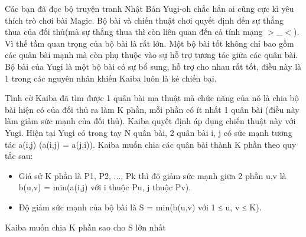 Các bạn đã đọc bộ truyện tranh Nhật Bản Yugi-oh chắc hẳn ai cũng cực kì yêu thích trò chơi bài Magic. Bộ bài và chiến thuật chơi quyết định đến sự thắng thua của đối thủ(mà sự thắng thua thì còn liên quan đến cả tính mạng $>$\_$<$). Vì thế tầm quan trọng của bộ bài là rất lớn. Một bộ bài tốt không chỉ bao gồm các quân bài mạnh mà còn phụ thuộc vào sự hỗ trợ tương tác giữa các quân bài. Bộ bài của Yugi là một bộ bài có sự bổ sung, hỗ trợ cho nhau rất tốt, điều này là 1 trong các nguyên nhân khiến Kaiba luôn là kẻ chiến bại.  

   Tình cờ Kaiba đã tìm được 1 quân bài ma thuật mà chức năng của nó là chia bộ bài hiện có của đối thủ ra làm K phần, mỗi phần có ít nhất 1 quân bài (điều này làm giảm sức mạnh của đối thủ). Kaiba quyết định áp dụng chiến thuật này với Yugi. Hiện tại Yugi có trong tay N quân bài, 2 quân bài i, j có sức mạnh tương tác a(i,j) (a(i,j) = a(j,i)). Kaiba muốn chia các quân bài thành K phần theo quy tắc sau:  
\begin{itemize}
	\item     Giả sử K phần là P1, P2, ..., Pk thì độ giảm sức mạnh giữa 2 phần u,v là b(u,v) = min(a(i,j) với i thuộc Pu, j thuộc Pv).   
	\item     Độ giảm sức mạnh của bộ bài là S = min(b(u,v) với 1 ≤ u, v ≤ K).   
\end{itemize}

   Kaiba muốn chia K phần sao cho S lớn nhất